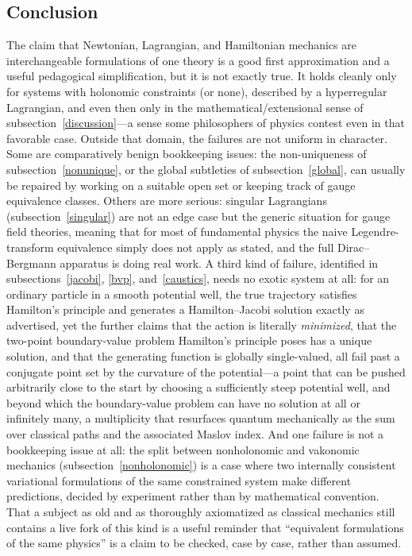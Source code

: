 \subsection{Conclusion}
\label{conclusion}

The claim that Newtonian, Lagrangian, and Hamiltonian mechanics are
interchangeable formulations of one theory is a good first approximation and a
useful pedagogical simplification, but it is not exactly true. It holds cleanly
only for systems with holonomic constraints (or none), described by a
hyperregular Lagrangian, and even then only in the mathematical/extensional
sense of subsection~\ref{discussion}---a sense some philosophers of physics
contest even in that favorable case. Outside that domain, the failures are not
uniform in character. Some are comparatively benign bookkeeping issues: the
non-uniqueness of subsection~\ref{nonunique}, or the global subtleties of
subsection~\ref{global}, can usually be repaired by working on a suitable open
set or keeping track of gauge equivalence classes. Others are more serious:
singular Lagrangians (subsection~\ref{singular}) are not an edge case but the
generic situation for gauge field theories, meaning that for most of
fundamental physics the naive Legendre-transform equivalence simply does not
apply as stated, and the full Dirac--Bergmann apparatus is doing real work. A
third kind of failure, identified in subsections~\ref{jacobi}, \ref{bvp},
and~\ref{caustics}, needs no exotic system at all: for an ordinary particle in
a smooth potential well, the true trajectory satisfies Hamilton's principle and
generates a Hamilton--Jacobi solution exactly as advertised, yet the further
claims that the action is literally \emph{minimized}, that the two-point
boundary-value problem Hamilton's principle poses has a unique solution, and
that the generating function is globally single-valued, all fail past a
conjugate point set by the curvature of the potential---a point that can be
pushed arbitrarily close to the start by choosing a sufficiently steep
potential well, and beyond which the boundary-value problem can have no
solution at all or infinitely many, a multiplicity that resurfaces quantum
mechanically as the sum over classical paths and the associated Maslov index.
And one failure is not a bookkeeping issue at all: the split between
nonholonomic and vakonomic mechanics (subsection~\ref{nonholonomic}) is a case
where two internally consistent variational formulations of the same
constrained system make different predictions, decided by experiment rather
than by mathematical convention. That a subject as old and as thoroughly
axiomatized as classical mechanics still contains a live fork of this kind is a
useful reminder that ``equivalent formulations of the same physics'' is a claim
to be checked, case by case, rather than assumed.
